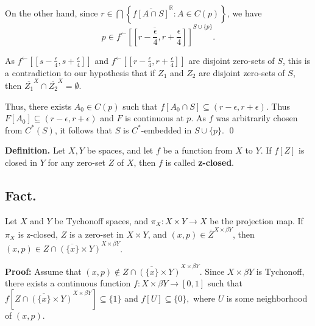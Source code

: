 \documentclass{article}
\begin{document}
\vskip 10pt

On the other hand, since $r\in \bigcap \left\{\overline{f[A\cap S]}^\mathbb{R}: A\in C(p)\right\}$, we have $$p\in \overline{f^\leftarrow \left[[r-\frac{\epsilon}{4}, r+\frac{\epsilon}{4}]\right] }^{S\cup \{p\}}.$$

\vskip 15pt


As  $f^\leftarrow\left[[s-\frac{\epsilon}{4},s+\frac{\epsilon}{4}]\right]$ and $f^\leftarrow \left[[r-\frac{\epsilon}{4}, r+\frac{\epsilon}{4}]\right]$ are disjoint zero-sets of $S$, this is a contradiction to our hypothesis that if $Z_1$ and $Z_2$ are disjoint zero-sets of $S$, then $\overline{Z_1}^X\cap \overline{Z_2}^X=\emptyset$. 

\vskip 20pt
 
Thus, there exists $A_0\in C(p)$ such that $f\left[A_0\cap S\right]\subseteq (r-\epsilon, r+\epsilon).$ Thus $F[A_0]\subseteq (r-\epsilon, r+\epsilon)$ and $F$ is continuous at $p$. As $f$ was arbitrarily chosen from $C^*(S)$, it follows that $S$ is $C^*$-embedded in $S\cup\{p\}.$ \qed








\vskip 40pt





\textbf{Definition.} Let $X,Y$ be spaces, and let $f$ be a function from $X$ to $Y$. If $f[Z]$ is closed in $Y$ for any zero-set $Z$ of $X$, then $f$ is called \textbf{z-closed}.

\vskip 30pt






\subsection{Fact.}  Let $X$ and $Y$ be Tychonoff spaces, and $\pi_X: X\times Y\rightarrow X$ be the projection map. If $\pi_X$ is z-closed, $Z$ is a zero-set in $X\times Y$, and $(x,p)\in \overline{Z}^{X\times \beta Y}$, then $(x,p)\in \overline{Z\cap \left(\{x\}\times Y\right)}^{X\times \beta Y}$.

\vskip 20pt
 
\textbf{Proof: }Assume that $(x,p)\notin \overline{Z\cap (\{x\}\times Y)}^{X\times \beta Y}.$ Since $X\times \beta Y$ is Tychonoff, there exists a continuous function $f: X\times \beta Y \rightarrow [0,1]$ such that $f\left[\overline{Z\cap (\{x\}\times Y)}^{X\times \beta Y}\right] \subseteq \{1\}$ and $f[U]\subseteq \{0\},$ where $U$ is some neighborhood of $(x,p).$ 
\end{document}
